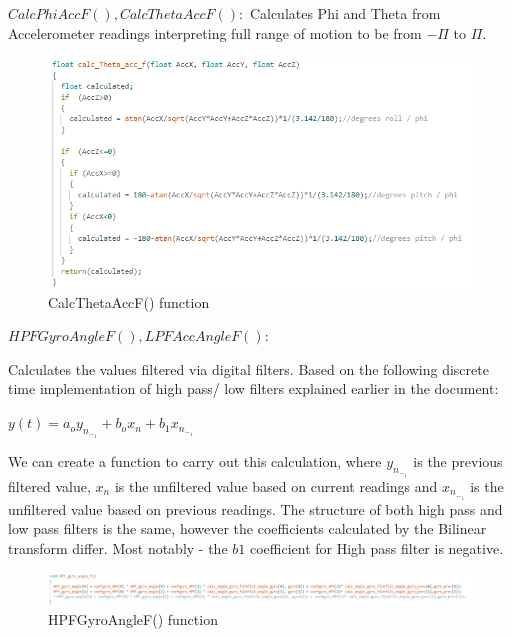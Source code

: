 \begin{flushleft}
\begin{flushleft}
\begin{flushleft}
$CalcPhiAccF(), CalcThetaAccF():$\newline
Calculates Phi and Theta from Accelerometer readings interpreting full range of motion to be from $-\Pi$ to $\Pi$.

\begin{figure}[H]
    \begin{center}
    \includegraphics[scale = 0.85]{pictures/IMU/calc_angle_theta.png}
    \end{center}
    \caption{CalcThetaAccF() function}
    \label{fig:my_label}
\end{figure}

\begin{flushleft}
$HPFGyroAngleF(), LPFAccAngleF():$\newline

Calculates the values filtered via digital filters. Based on the following discrete time implementation of high pass/ low filters explained earlier in the document:
\end{flushleft}
$y(t)=a_o y_n_-_1+b_ox_n+b_1x_n_-_1  $

\begin{flushleft}
We can create a function to carry out this calculation, where $y_n_-_1$ is the previous filtered value, $x_n$ is the unfiltered value based on current readings and $x_n_-_1$ is the unfiltered value based on previous readings. The structure of both high pass and low pass filters is the same, however the coefficients calculated by the Bilinear transform differ. Most notably - the 
$b1$ coefficient for High pass filter is negative.

\begin{figure}[H]
    \begin{center}
    \includegraphics[scale = 0.85]{pictures/IMU/HPF_gyro.png}
    \end{center}
    \caption{HPFGyroAngleF() function}
    \label{fig:my_label}
\end{figure}


\end{flushleft}
\end{flushleft}
\end{flushleft}
\end{flushleft}
